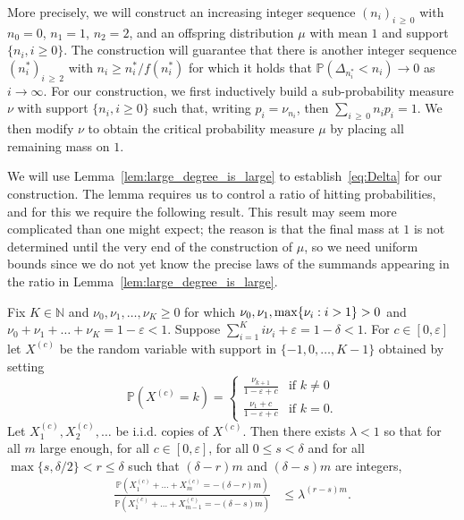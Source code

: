 \documentclass[AHL,Unicode,longabstracts,published]{cedram}
\newcommand{\N}{\mathbb{N}}
\renewcommand{\P}{\mathbb{P}}
\begin{document}
More precisely, we will construct an increasing integer sequence $(n_i)_{i\,\ge\,0}$ with $n_0=0$, $n_1=1$, $n_2=2$, and an offspring distribution $\mu$ with mean $1$ and support $\{n_i,i \ge 0\}$. The construction will guarantee that there is another integer sequence $(n^*_i)_{i\,\geq\,2}$ with $n_i\geq n^*_i/f(n^*_i)$ for which it holds that $
\P(\Delta_{n^*_i}< n_i)\to 0 $ as $i\to \infty$. For our construction, we first inductively build a sub-probability measure $\nu$ with support $\{n_i,i \ge 0\}$ such that, writing $p_i=\nu_{n_i}$, then $\sum_{i\,\ge\,0} n_ip_i=1$. We then modify $\nu$ to obtain the critical probability measure $\mu$ by placing all remaining mass on $1$.

We will use Lemma~\ref{lem:large_degree_is_large} to establish~\eqref{eq:Delta} for our construction. The lemma requires us to control a ratio of hitting probabilities, and for this we require the following {result}. This {result} may seem more complicated than one might expect; the reason is that the final mass at $1$ is not determined until the very end of the construction of $\mu$, so {we need uniform bounds since }we do not yet know the precise laws of the summands appearing in the ratio in Lemma~\ref{lem:large_degree_is_large}.

\begin{lemm}\label{lem:localLDP}
Fix $K\in \N$ and $\nu_{0},\nu_1,\dots, \nu_K\ge 0$ for which $\nu_{0},\nu_1,{\max\{\nu_i:i>1\}}\linebreak>0$ and $\nu_{0}+\nu_1+\dots+\nu_K=1-\varepsilon<1$. Suppose $\sum_{i=1}^K i\nu_i+\varepsilon=1-\delta<1$. For $c\in [0,\varepsilon]$ let $X^{(c)}$ be the random variable with support in $\{-1,0,\dots, K-1\}$ obtained by setting
\[
\P(X^{(c)}=k)=
\begin{cases}
\frac{\nu_{k+1}}{ 1-\varepsilon +c } &\text{if }k\neq 0 \\ \frac{\nu_1+c}{1-\varepsilon+c} &\text{if }k=0.
\end{cases}
\]
Let $X^{(c)}_1,X^{(c)}_2,\dots$ be i.i.d. copies of $X^{(c)}$. Then there exists $\lambda<1$ so that for all $m$ large enough, for all $c\in [0,\varepsilon]$, for all $0\leq s <\delta$ and for all $\max\{s,\delta/2\}< r\le \delta $ such that $(\delta-r)m$ and $(\delta-s)m$ are integers,
\begin{align}\label{eq:exp_tails_multinom}
\frac{\P\left(X^{(c)}_1+\dots+X^{(c)}_{m}=-(\delta-r)m\right)}{
\P\left(X^{(c)}_1+\dots+X^{(c)}_{m-1}=-(\delta-s)m\right)}&\leq \lambda^{(r-s)m}.
\end{align}
\end{lemm}
\end{document}
